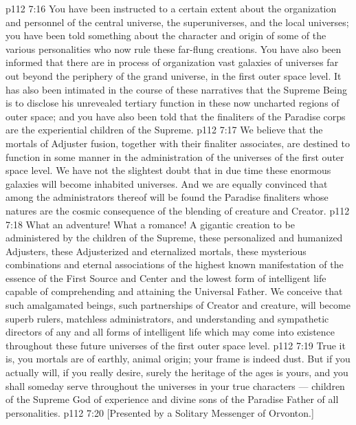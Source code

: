 \vs p112 7:16 You have been instructed to a certain extent about the organization and personnel of the central universe, the superuniverses, and the local universes; you have been told something about the character and origin of some of the various personalities who now rule these far\hyp{}flung creations. You have also been informed that there are in process of organization vast galaxies of universes far out beyond the periphery of the grand universe, in the first outer space level. It has also been intimated in the course of these narratives that the Supreme Being is to disclose his unrevealed tertiary function in these now uncharted regions of outer space; and you have also been told that the finaliters of the Paradise corps are the experiential children of the Supreme.
\vs p112 7:17 We believe that the mortals of Adjuster fusion, together with their finaliter associates, are destined to function in some manner in the administration of the universes of the first outer space level. We have not the slightest doubt that in due time these enormous galaxies will become inhabited universes. And we are equally convinced that among the administrators thereof will be found the Paradise finaliters whose natures are the cosmic consequence of the blending of creature and Creator.
\vs p112 7:18 What an adventure! What a romance! A gigantic creation to be administered by the children of the Supreme, these personalized and humanized Adjusters, these Adjusterized and eternalized mortals, these mysterious combinations and eternal associations of the highest known manifestation of the essence of the First Source and Center and the lowest form of intelligent life capable of comprehending and attaining the Universal Father. We conceive that such amalgamated beings, such partnerships of Creator and creature, will become superb rulers, matchless administrators, and understanding and sympathetic directors of any and all forms of intelligent life which may come into existence throughout these future universes of the first outer space level.
\vs p112 7:19 \pc True it is, you mortals are of earthly, animal origin; your frame is indeed dust. But if you actually will, if you really desire, surely the heritage of the ages is yours, and you shall someday serve throughout the universes in your true characters --- children of the Supreme God of experience and divine sons of the Paradise Father of all personalities.
\vsetoff
\vs p112 7:20 [Presented by a Solitary Messenger of Orvonton.]
